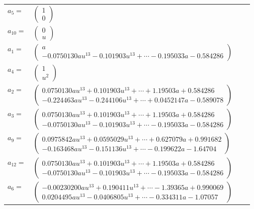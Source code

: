 \documentclass[1p]{elsarticle_modified}
\theoremstyle{definition}
\begin{document}
\begin{tabular}{m{7pt} m{180pt} m{7pt} m{180pt} }
\flushright $a_{5}=$&$\begin{pmatrix}1\\0\end{pmatrix}$ \\
\flushright $a_{10}=$&$\begin{pmatrix}0\\u\end{pmatrix}$ \\
\flushright $a_{1}=$&$\begin{pmatrix}a\\-0.0750130 a u^{13}-0.101903 u^{13}+\cdots-0.195033 a-0.584286\end{pmatrix}$ \\
\flushright $a_{4}=$&$\begin{pmatrix}1\\u^2\end{pmatrix}$ \\
\flushright $a_{2}=$&$\begin{pmatrix}0.0750130 a u^{13}+0.101903 u^{13}+\cdots+1.19503 a+0.584286\\-0.224463 a u^{13}-0.244106 u^{13}+\cdots+0.0452147 a-0.589078\end{pmatrix}$ \\
\flushright $a_{3}=$&$\begin{pmatrix}0.0750130 a u^{13}+0.101903 u^{13}+\cdots+1.19503 a+0.584286\\-0.0750130 a u^{13}-0.101903 u^{13}+\cdots-0.195033 a-0.584286\end{pmatrix}$ \\
\flushright $a_{9}=$&$\begin{pmatrix}0.0975842 a u^{13}+0.0595029 u^{13}+\cdots+0.627079 a+0.991682\\-0.163468 a u^{13}-0.151136 u^{13}+\cdots-0.199622 a-1.64704\end{pmatrix}$ \\
\flushright $a_{12}=$&$\begin{pmatrix}0.0750130 a u^{13}+0.101903 u^{13}+\cdots+1.19503 a+0.584286\\-0.0750130 a u^{13}-0.101903 u^{13}+\cdots-0.195033 a-0.584286\end{pmatrix}$ \\
\flushright $a_{6}=$&$\begin{pmatrix}-0.00230200 a u^{13}+0.190411 u^{13}+\cdots-1.39365 a+0.990069\\0.0204495 a u^{13}-0.0406805 u^{13}+\cdots-0.334311 a-1.07057\end{pmatrix}$ \\

\end{tabular}
\end{document}
